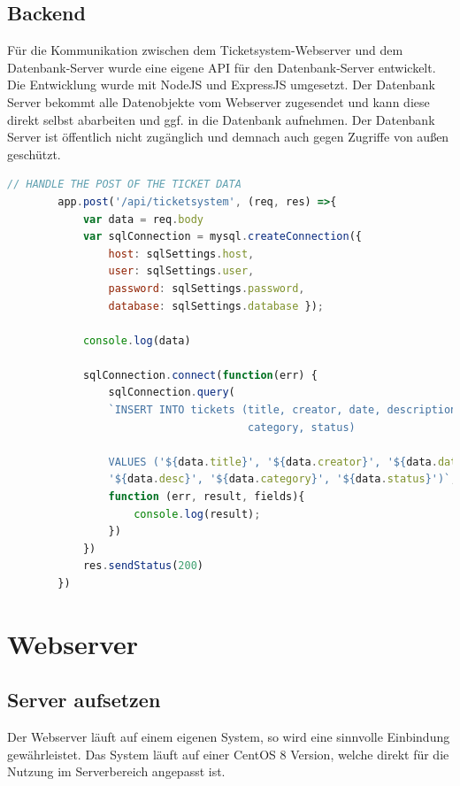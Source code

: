 \documentclass{scrartcl}
\begin{document}
\begin{flushleft}
    

    \subsection{Backend}
    Für die Kommunikation zwischen dem Ticketsystem-Webserver und dem Datenbank-Server wurde eine eigene API für den Datenbank-Server entwickelt. Die Entwicklung wurde mit NodeJS und ExpressJS umgesetzt.
    Der Datenbank Server bekommt alle Datenobjekte vom Webserver zugesendet und kann diese direkt selbst abarbeiten und ggf. in die Datenbank aufnehmen. Der Datenbank Server ist öffentlich nicht zugänglich und demnach auch gegen Zugriffe von außen geschützt.
    
    \begin{lstlisting}[language=JavaScript, caption={Datenbank API-Endpunkt: Ticket in Datenbank aufnehmen}, captionpos=t]
        // HANDLE THE POST OF THE TICKET DATA
        app.post('/api/ticketsystem', (req, res) =>{
            var data = req.body
            var sqlConnection = mysql.createConnection({
                host: sqlSettings.host,
                user: sqlSettings.user,
                password: sqlSettings.password,
                database: sqlSettings.database });

            console.log(data)

            sqlConnection.connect(function(err) {        
                sqlConnection.query(
                `INSERT INTO tickets (title, creator, date, description,
                                      category, status) 

                VALUES ('${data.title}', '${data.creator}', '${data.date}', 
                '${data.desc}', '${data.category}', '${data.status}')`, 
                function (err, result, fields){
                    console.log(result);
                })
            })
            res.sendStatus(200)
        })\end{lstlisting}

    \newpage

    \section{Webserver}
    \subsection{Server aufsetzen}
    Der Webserver läuft auf einem eigenen System, so wird eine sinnvolle Einbindung gewährleistet. Das System läuft auf einer CentOS 8 Version, welche direkt für die Nutzung im Serverbereich angepasst ist. 
    

\end{flushleft}
\end{document}
